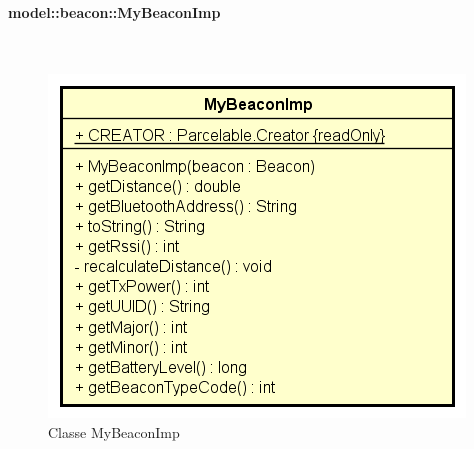 \documentclass[../DefinizioneDiProdotto.tex]{subfiles}
\begin{document}
\paragraph{model::beacon::MyBeaconImp}
\
\begin{figure}[H]
	\centering
	\includegraphics[width=\maxwidth]{img/MyBeaconImp.png}
	\caption{Classe MyBeaconImp}\label{fig:model::beacon::MyBeaconImp} 
\end{figure}
\end{document}
